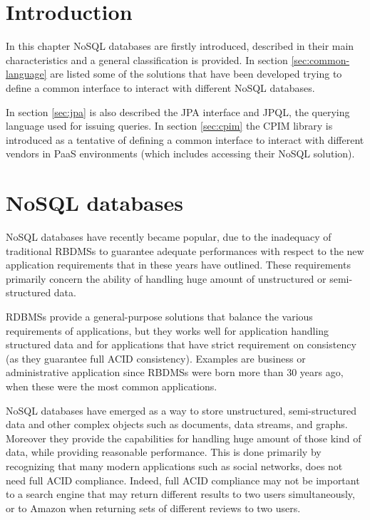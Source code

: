 \section{Introduction}
In this chapter NoSQL databases are firstly introduced, described in their main characteristics and a general classification is provided. In section \ref{sec:common-language} are listed some of the solutions that have been developed trying to define a common interface to interact with different NoSQL databases.

\noindent In section \ref{sec:jpa} is also described the JPA interface and JPQL, the querying language used for issuing queries. In section \ref{sec:cpim} the CPIM library is introduced as a tentative of defining a common interface to interact with different vendors in PaaS environments (which includes accessing their NoSQL solution).

\section{NoSQL databases}
\label{sec:nosql}
NoSQL databases have recently became popular, due to the inadequacy of traditional RBDMSs to guarantee adequate performances with respect to the new application requirements that in these years have outlined. These requirements primarily concern the ability of handling huge amount of unstructured or semi-structured data.

\noindent RDBMSs provide a general-purpose solutions that balance the various requirements of applications, but they works well for application handling structured data and for applications that have strict requirement on consistency (as they guarantee full ACID consistency). Examples are business or administrative application since RBDMSs were born more than 30 years ago, when these were the most common applications.

\noindent NoSQL databases have emerged as a way to store unstructured, semi-structured data and other complex objects such as documents, data streams, and graphs. Moreover they provide the capabilities for handling huge amount of those kind of data, while providing reasonable performance.
This is done primarily by recognizing that many modern applications such as social networks, does not need full ACID compliance. Indeed, full ACID compliance may not be important to a search engine that may return different results to two users simultaneously, or to Amazon when returning sets of different reviews to two users.

